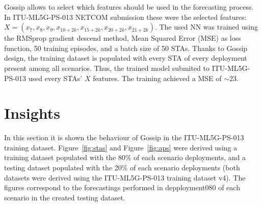 \documentclass{article}
\begin{document}
Gossip allows to select which features should be used
in the forecasting process. In ITU-ML5G-PS-013 NETCOM
submission these were the selected features:
$X=(x_7,x_8,x_9,x_{10+2k},x_{15+2k},x_{20+2k},x_{21+2k})$.
The used NN was trained using the RMSprop gradient
descend method, Mean Squared Error (MSE) as
loss function, 50 training episodes, and a batch size
of 50 STAs.
Thanks to Gossip design, the training dataset is populated
with every STA of every deployment present among all
scenarios. Thus, the trained model submited to
ITU-ML5G-PS-013 used every STAs' $X$ features.
The training achieved a MSE of $\sim 23$.





\section{Insights}
In this section it is shown the behaviour of Gossip
in the ITU-ML5G-PS-013 training dataset.
Figure~\ref{fig:stas} and Figure~\ref{fig:aps} were
derived using a training dataset populated with the 80\% of each
scenario deployments, and a testing dataset populated with
the 20\% of each scenario deployments (both datasets
were derived using the ITU-ML5G-PS-013 training dataset
v4).
The figures correspond to the forecastings
performed in depployment080 of each scenario in the
created testing dataset.
\end{document}
